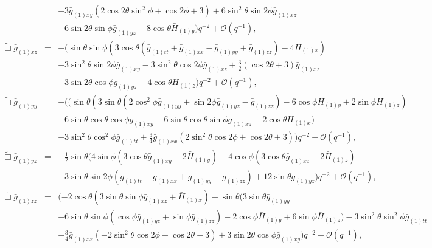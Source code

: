 \documentclass[aps,letterpaper,twocolumn,nofootinbib]{revtex4}
\numberwithin{equation}{section}
\begin{document}
\begin{widetext}
\begin{eqnarray}
&&+3 \bar{g}_{(1)xy} (2 \cos 2\theta \sin ^2\phi +\cos 2 \phi +3)+6 \sin ^2\theta \sin 2 \phi 
  \bar{g}_{(1)xz} \nonumber \\
  &&+6 \sin 2 \theta \sin \phi \bar{g}_{(1)yz}-8 \cos
  \theta  \bar{H}_{(1) y})    q^{-2} +\mathcal{O}(q^{-1}),\\
%
\label{eqn:efexz}
\tilde{\Box}\bar{g}_{(1)xz}&=&- (\sin \theta  \sin \phi  (3 \cos \theta  (\bar{g}_{(1)tt}+\bar{g}_{(1)xx}-\bar{g}_{(1)yy}+\bar{g}_{(1)zz})-4
   \bar{H}_{(1) x}) \nonumber \\
   &&+3 \sin ^2\theta \sin 2 \phi  \bar{g}_{(1)xy}-3 \sin
   ^2\theta  \cos 2 \phi  \bar{g}_{(1)xz}+\frac{3}{2} (\cos 2 \theta +3)
   \bar{g}_{(1)xz} \nonumber \\
   &&+3 \sin 2 \theta  \cos \phi  \bar{g}_{(1)yz}-4 \cos
   \theta  \bar{H}_{(1)z})    q^{-2} +\mathcal{O}(q^{-1}),\\
%
\label{eqn:efeyy}
\tilde{\Box}\bar{g}_{(1)yy}&=&-( (\sin \theta (3 \sin \theta  (2 \cos ^2\phi  \bar{g}_{(1)yy}+\sin 2 \phi  \bar{g}_{(1)yz}-\bar{g}_{(1)zz}) -6 \cos\phi \bar{H}_{(1) y}+2 \sin \phi  \bar{H}_{(1) z}) \nonumber \\
&&+6 \sin \theta \cos
   \theta \cos \phi  \bar{g}_{(1)xy}-6 \sin \theta  \cos \theta  \sin   \phi  \bar{g}_{(1)xz}+2 \cos \theta  \bar{H}_{(1) x}) \nonumber \\
   &&-3 \sin ^2\theta \cos ^2\phi  \bar{g}_{(1)tt}+\frac{3}{4} \bar{g}_{(1)xx} (2 \sin ^2\theta  \cos 2 \phi +\cos 2 \theta +3)  )  q^{-2} +\mathcal{O}(q^{-1}),\\
%
\label{eqn:efeyz}
\tilde{\Box}\bar{g}_{(1)yz}&=&-\frac{1}{2} \sin \theta (4 \sin \phi  (3 \cos \theta  \bar{g}_{(1)xy}-2 \bar{H}_{(1) y})+4 \cos \phi  (3 \cos \theta  \bar{g}_{(1)xz}-2 \bar{H}_{(1) z}) \nonumber \\
&&+3 \sin \theta  \sin 2 \phi  (\bar{g}_{(1)tt}-\bar{g}_{(1)xx}+\bar{g}_{(1)yy}+\bar{g}_{(1)zz})+12 \sin \theta  \bar{g}_{(1)yz})  q^{-2} +\mathcal{O}(q^{-1}),\\
%
\label{eqn:efezz}
\tilde{\Box}\bar{g}_{(1)zz}&=&(-2 \cos \theta  (3 \sin \theta  \sin \phi  \bar{g}_{(1)xz}+\bar{H}_{(1)x}) + \sin \theta  (3 \sin \theta  \bar{g}_{(1)yy}\nonumber \\
&&-6 \sin\theta  \sin \phi  (\cos \phi  \bar{g}_{(1)yz}+\sin \phi 
   \bar{g}_{(1)zz}) -2 \cos \phi  \bar{H}_{(1) y} +6 \sin \phi  \bar{H}_{(1)z}) -3  \sin ^2\theta  \sin ^2\phi  \bar{g}_{(1)tt} \nonumber \\
   &&+\frac{3}{4}  \bar{g}_{(1)xx} (-2 \sin ^2\theta  \cos 2 \phi +\cos 2 \theta
   +3) +3 \sin 2 \theta  \cos \phi  \bar{g}_{(1)xy})  q^{-2} +\mathcal{O}(q^{-1}), 
\end{eqnarray}
\end{widetext}
\end{document}
